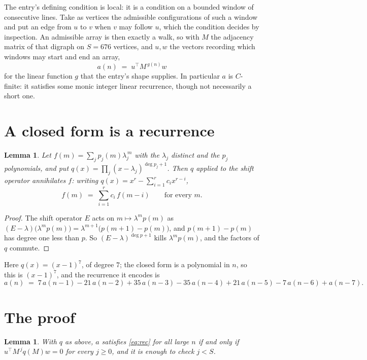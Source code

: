 \documentclass[11pt,a4paper]{article}
\theoremstyle{plain}
\newtheorem{lemma}[theorem]{Lemma}
\theoremstyle{definition}
\begin{document}
The entry's defining condition is local: it is a condition on a bounded window of consecutive lines. Take as vertices the
admissible configurations of such a window and put an edge from $u$ to $v$ when $v$ may
follow $u$, which the condition decides by inspection. An admissible array is then exactly a
walk, so with $M$ the adjacency matrix of that digraph on $S=676$ vertices, and $u,w$ the
vectors recording which windows may start and end an array,
\[
a(n)\;=\;u^{\!\top}M^{\,g(n)}w
\]
for the linear function $g$ that the entry's shape supplies. In particular $a$ is
$C$-finite: it satisfies some monic integer linear recurrence, though not necessarily a short
one.

\section{A closed form is a recurrence}

\begin{lemma}\label{lem:ann}
Let $f(m)=\sum_{j}p_j(m)\lambda_j^{\,m}$ with the $\lambda_j$ distinct and the $p_j$
polynomials, and put $q(x)=\prod_j(x-\lambda_j)^{\deg p_j+1}$. Then $q$ applied to the shift
operator annihilates $f$: writing $q(x)=x^{r}-\sum_{i=1}^{r}c_ix^{r-i}$,
\[
f(m)\;=\;\sum_{i=1}^{r}c_i\,f(m-i)\qquad\text{for every }m.
\]
\end{lemma}

\begin{proof}
The shift operator $E$ acts on $m\mapsto\lambda^{m}p(m)$ as
$(E-\lambda)\bigl(\lambda^{m}p(m)\bigr)=\lambda^{m+1}\bigl(p(m+1)-p(m)\bigr)$, and
$p(m+1)-p(m)$ has degree one less than $p$. So $(E-\lambda)^{\deg p+1}$ kills
$\lambda^{m}p(m)$, and the factors of $q$ commute.
\end{proof}

Here $q(x)=(x-1)^{7}$, of degree $7$; the closed form is a polynomial in $n$, so this is $(x-1)^{7}$, and the recurrence it encodes is
\begin{equation}\label{eq:rec}
a(n)\;=\;7\,a(n-1) - 21\,a(n-2) + 35\,a(n-3) - 35\,a(n-4) + 21\,a(n-5) - 7\,a(n-6) + a(n-7).
\end{equation}

\section{The proof}

\begin{lemma}\label{lem:crit}
With $q$ as above, $a$ satisfies \eqref{eq:rec} for all large $n$ if and only if
$u^{\!\top}M^{\,j}q(M)w=0$ for every $j\ge0$, and it is enough to check $j<S$.
\end{lemma}
\end{document}
